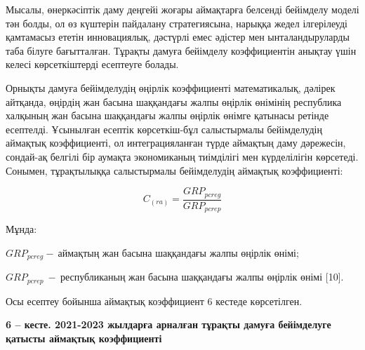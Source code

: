 \begin{multicols}{2}
Мысалы, өнеркәсіптік даму деңгейі жоғары аймақтарға белсенді бейімделу
моделі тән болды, ол өз күштерін пайдалану стратегиясына, нарыққа жедел
ілгерілеуді қамтамасыз ететін инновациялық, дәстүрлі емес әдістер мен
ынталандыруларды таба білуге бағытталған. Тұрақты дамуға бейімделу
коэффициентін анықтау үшін келесі көрсеткіштерді есептеуге болады.

Орнықты дамуға бейімделудің өңірлік коэффициенті математикалық, дәлірек
айтқанда, өңірдің жан басына шаққандағы жалпы өңірлік өнімінің
республика халқының жан басына шаққандағы жалпы өңірлік өнімге қатынасы
ретінде есептелді. Ұсынылған есептік көрсеткіш-бұл салыстырмалы
бейімделудің аймақтық коэффициенті, ол интеграцияланған түрде аймақтың
даму дәрежесін, сондай-ақ белгілі бір аумақта экономиканың тиімділігі
мен күрделілігін көрсетеді. Сонымен, тұрақтылыққа салыстырмалы
бейімделудің аймақтық коэффициенті:

\[C_{(ra)} = \frac{{GRP}_{pcreg}}{{GRP}_{pcrep}}\]

Мұнда:

\({GRP}_{pcreg} - \ аймақтың\) жан басына шаққандағы жалпы өңірлік
өнімі;

\({GRP}_{pcrep}\  - \ \)республиканың жан басына шаққандағы жалпы
өңірлік өнімі {[}10{]}.

Осы есептеу бойынша аймақтық коэффициент 6 кестеде көрсетілген.
\end{multicols}

{\bfseries 6 -- кесте. 2021-2023 жылдарға арналған тұрақты дамуға
бейімделуге қатысты аймақтық коэффициенті}

